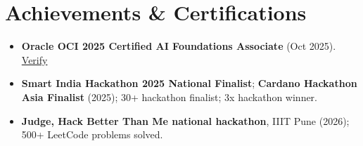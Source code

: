 \documentclass[letterpaper,10pt]{article}
\begin{document}
\section*{Achievements \& Certifications}
\begin{itemize}
  \item \textbf{Oracle OCI 2025 Certified AI Foundations Associate} (Oct 2025).
  \href{https://catalog-education.oracle.com/ords/certview/sharebadge_m?id=9079AD3E2DB0260D0569A1062807EFA4F7AD2480F04D31208713EB0AB82392A0}{Verify}
  \item \textbf{Smart India Hackathon 2025 National Finalist}; \textbf{Cardano Hackathon Asia Finalist} (2025); 30+ hackathon finalist; 3x hackathon winner.
  \item \textbf{Judge, Hack Better Than Me national hackathon}, IIIT Pune (2026); 500+ LeetCode problems solved.
\end{itemize}
\end{document}
